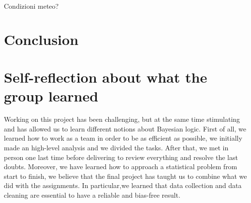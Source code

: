 \documentclass[
]{article}
\begin{document}
Condizioni meteo?

\hypertarget{conclusion}{%
\section{Conclusion}\label{conclusion}}

\hypertarget{self-reflection-about-what-the-group-learned}{%
\section{Self-reflection about what the group
learned}\label{self-reflection-about-what-the-group-learned}}

Working on this project has been challenging, but at the same time
stimulating and has allowed us to learn different notions about Bayesian
logic. First of all, we learned how to work as a team in order to be as
efficient as possible, we initially made an high-level analysis and we
divided the tasks. After that, we met in person one last time before
delivering to review everything and resolve the last doubts. Moreover,
we have learned how to approach a statistical problem from start to
finish, we believe that the final project has taught us to combine what
we did with the assignments. In particular,we learned that data
collection and data cleaning are essential to have a reliable and
bias-free result.
\end{document}
